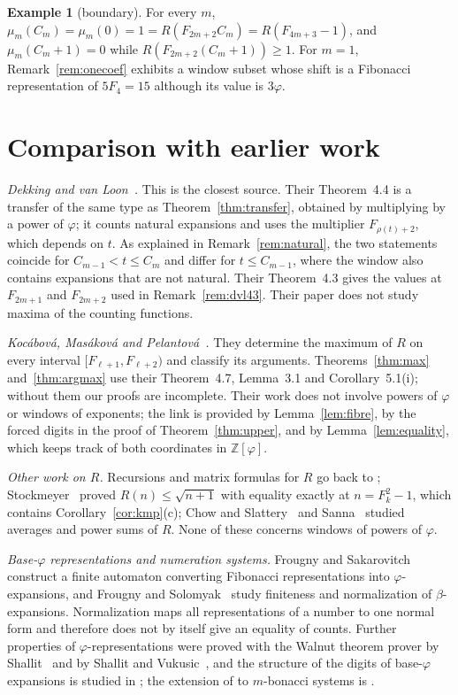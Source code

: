 \documentclass[11pt]{amsart}
\theoremstyle{definition}
\newtheorem{example}[theorem]{Example}
\theoremstyle{remark}
\numberwithin{equation}{section}
\newcommand{\Z}{\mathbb{Z}}
\begin{document}
\begin{example}[boundary]
For every $m$, $\mu_m(C_m)=\mu_m(0)=1=R(F_{2m+2}C_m)=R(F_{4m+3}-1)$, and $\mu_m(C_m+1)=0$ while
$R(F_{2m+2}(C_m+1))\ge1$. For $m=1$, Remark~\ref{rem:onecoef} exhibits a window subset whose shift is a
Fibonacci representation of $5F_4=15$ although its value is $3\varphi$.
\end{example}

\section{Comparison with earlier work}\label{sec:prior}

\emph{Dekking and van Loon~\cite{DekkingVanLoon2024}.} This is the closest source. Their
Theorem~4.4 is a transfer of the same type as Theorem~\ref{thm:transfer}, obtained by multiplying by
a power of $\varphi$; it counts natural expansions and uses the multiplier $F_{\rho(t)+2}$, which
depends on $t$. As explained in Remark~\ref{rem:natural}, the two statements coincide for
$C_{m-1}<t\le C_m$ and differ for $t\le C_{m-1}$, where the window also contains expansions that are
not natural. Their Theorem~4.3 gives the values at $F_{2m+1}$ and $F_{2m+2}$ used in
Remark~\ref{rem:dvl43}. Their paper does not study maxima of the counting functions.

\emph{Koc\'abov\'a, Mas\'akov\'a and Pelantov\'a~\cite{KMP2005}.} They determine the maximum of $R$ on
every interval $[F_{\ell+1},F_{\ell+2})$ and classify its arguments. Theorems~\ref{thm:max}
and~\ref{thm:argmax} use their Theorem~4.7, Lemma~3.1 and Corollary~5.1(i); without them our proofs
are incomplete. Their work does not involve powers of $\varphi$ or windows of exponents; the link is
provided by Lemma~\ref{lem:fibre}, by the forced digits in the proof of Theorem~\ref{thm:upper}, and by
Lemma~\ref{lem:equality}, which keeps track of both coordinates in $\Z[\varphi]$.

\emph{Other work on $R$.} Recursions and matrix formulas for $R$ go back to
\cite{Klarner1966,Robbins1996,BicknellFielder1999,Berstel2001}; Stockmeyer~\cite{Stockmeyer2009}
proved $R(n)\le\sqrt{n+1}$ with equality exactly at $n=F_k^2-1$, which contains
Corollary~\ref{cor:kmp}(c); Chow and Slattery~\cite{ChowSlattery2021} and Sanna~\cite{Sanna2025}
studied averages and power sums of $R$. None of these concerns windows of powers of $\varphi$.

\emph{Base-$\varphi$ representations and numeration systems.} Frougny and
Sakarovitch~\cite{FrougnySakarovitch1993} construct a finite automaton converting Fibonacci
representations into $\varphi$-expansions, and Frougny and Solomyak~\cite{FrougnySolomyak1992} study
finiteness and normalization of $\beta$-expansions. Normalization maps all representations of a
number to one normal form and therefore does not by itself give an equality of counts. Further
properties of $\varphi$-representations were proved with the Walnut theorem prover by
Shallit~\cite{Shallit2025} and by Shallit and Vukusic~\cite{ShallitVukusic2026}, and the structure of
the digits of base-$\varphi$ expansions is studied in \cite{Dekking2024Structure}; the extension of
\cite{KMP2005} to $m$-bonacci systems is \cite{KMP2007}.
\end{document}
